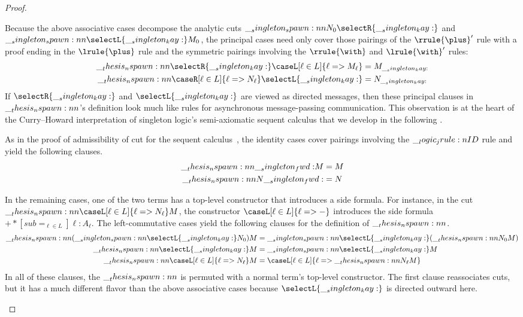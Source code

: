 \begin{proof}
\begin{description}[listparindent=\parindent, parsep=0pt]
  \item[Principal cases]
    Because the above associative cases decompose the analytic cuts $\spawn{N_0}{\selectR{\kay}}$ and $\spawn{\selectL{\kay}}{M_0}$, the principal cases need only cover those pairings of the $\rrule{\plus}'$ rule with a proof ending in the $\lrule{\plus}$ rule and the symmetric pairings involving the $\rrule{\with}$ and $\lrule{\with}'$ rules:
    \begin{align*}
      \nspawn{\selectR{\kay}}{\caseL[\ell \in L]{\ell => M_{\ell}}}
        &= M_{\kay}
      \\
      \nspawn{\caseR[\ell \in L]{\ell => N_{\ell}}}{\selectL{\kay}}
        &= N_{\kay}
    \end{align*}
    If $\selectR{\kay}$ and $\selectL{\kay}$ are viewed as directed messages, then these principal clauses in $\nspawn{}{}$'s definition look much like rules for asynchronous message-passing communication.
    This observation is at the heart of the Curry--Howard interpretation of singleton logic's semi-axiomatic sequent calculus that we develop in the following .

  \item[Identity cases]
    As in the proof of admissibility of cut for the sequent calculus~, the identity cases cover pairings involving the $\__logic_jrule:n {ID}$ rule and yield the following clauses.
    \begin{align*}
      \nspawn{\fwd}{M} &= M \\
      \nspawn{N}{\fwd} &= N
    \end{align*}


\item[Commutative cases]
  In the remaining cases, one of the two terms has a top-level constructor that introduces a side formula.
  For instance, in the cut $\nspawn{\caseL[\ell \in L]{\ell => N_{\ell}}}{M}$, the constructor $\caseL[\ell \in L]{\ell => \mathord{-}}$ introduces the side formula $\plus*[sub=_{\ell \in L}]{\ell:A_{\ell}}$.
  The left-commutative cases yield the following clauses for the definition of $\nspawn{}{}$.
  \begin{align*}
    \nspawn{(\spawn{\selectL{\kay}}{N_0})}{M}
      &= \spawn{\selectL{\kay}}{(\nspawn{N_0}{M})}
    \\
    \nspawn{\selectL{\kay}}{M} &= \spawn{\selectL{\kay}}{M}
    \\
    \nspawn{\caseL[\ell \in L]{\ell => N_{\ell}}}{M}
      &= \caseL[\ell \in L]{\ell => \nspawn{N_{\ell}}{M}}
  \end{align*}
  In all of these clauses, the $\nspawn{}{}$ is permuted with a normal term's top-level constructor.
  The first clause reassociates cuts, but it has a much different flavor than the above associative cases because $\selectL{\kay}$ is directed outward here.


\end{description}
\end{proof}
